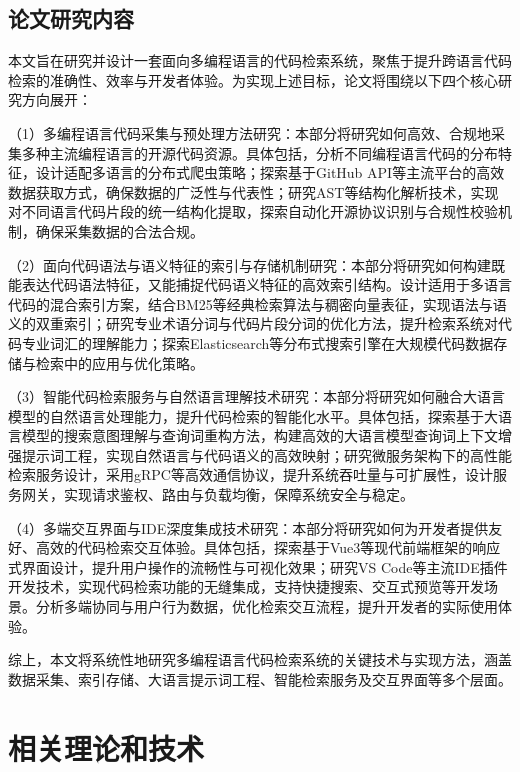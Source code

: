 \documentclass[UTF8,a4paper,12pt]{ctexart}
\numberwithin{equation}{section}
\begin{document}
\subsection{论文研究内容}
本文旨在研究并设计一套面向多编程语言的代码检索系统，聚焦于提升跨语言代码检索的准确性、效率与开发者体验。为实现上述目标，论文将围绕以下四个核心研究方向展开：\par
（1）多编程语言代码采集与预处理方法研究：本部分将研究如何高效、合规地采集多种主流编程语言的开源代码资源。具体包括，分析不同编程语言代码的分布特征，设计适配多语言的分布式爬虫策略；探索基于GitHub API等主流平台的高效数据获取方式，确保数据的广泛性与代表性；研究AST等结构化解析技术，实现对不同语言代码片段的统一结构化提取，探索自动化开源协议识别与合规性校验机制，确保采集数据的合法合规。\par
（2）面向代码语法与语义特征的索引与存储机制研究：本部分将研究如何构建既能表达代码语法特征，又能捕捉代码语义特征的高效索引结构。设计适用于多语言代码的混合索引方案，结合BM25等经典检索算法与稠密向量表征，实现语法与语义的双重索引；研究专业术语分词与代码片段分词的优化方法，提升检索系统对代码专业词汇的理解能力；探索Elasticsearch等分布式搜索引擎在大规模代码数据存储与检索中的应用与优化策略。\par
（3）智能代码检索服务与自然语言理解技术研究：本部分将研究如何融合大语言模型的自然语言处理能力，提升代码检索的智能化水平。具体包括，探索基于大语言模型的搜索意图理解与查询词重构方法，构建高效的大语言模型查询词上下文增强提示词工程，实现自然语言与代码语义的高效映射；研究微服务架构下的高性能检索服务设计，采用gRPC等高效通信协议，提升系统吞吐量与可扩展性，设计服务网关，实现请求鉴权、路由与负载均衡，保障系统安全与稳定。\par
（4）多端交互界面与IDE深度集成技术研究：本部分将研究如何为开发者提供友好、高效的代码检索交互体验。具体包括，探索基于Vue3等现代前端框架的响应式界面设计，提升用户操作的流畅性与可视化效果；研究VS Code等主流IDE插件开发技术，实现代码检索功能的无缝集成，支持快捷搜索、交互式预览等开发场景。分析多端协同与用户行为数据，优化检索交互流程，提升开发者的实际使用体验。\par
综上，本文将系统性地研究多编程语言代码检索系统的关键技术与实现方法，涵盖数据采集、索引存储、大语言提示词工程、智能检索服务及交互界面等多个层面。\par

\newpage
{}

\section{相关理论和技术}
\end{document}
